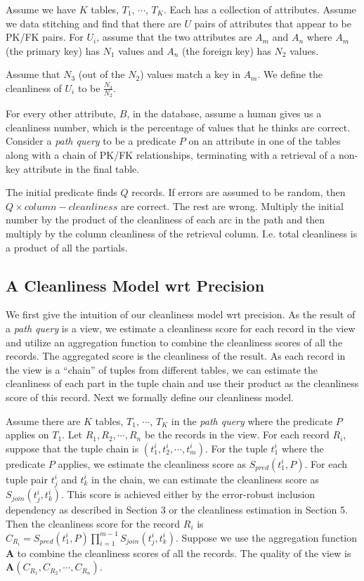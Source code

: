 Assume we have $K$ tables, $T_1$, $\cdots$, $T_K$.  Each has a collection of attributes. Assume we data stitching and find that there are $U$ pairs of attributes that appear to be PK/FK pairs.  For $U_i$, assume that the two attributes are $A_m$ and $A_n$ where $A_m$ (the primary key) has $N_1$ values and $A_n$ (the foreign key) has $N_2$ values. 

Assume that $N_3$ (out of the $N_2$) values match a key in $A_m$. We define the cleanliness of $U_i$ to be $\frac{N_3}{N_2}$.

For every other attribute, $B$, in the database, assume a human gives us a cleanliness number, which is the percentage of values that he thinks are correct. Consider a \emph{path query} to be a predicate $P$ on an attribute in one of the tables along with a chain of PK/FK relationships, terminating with a retrieval of a non-key attribute in the final table.

The initial predicate finds $Q$ records. If errors are assumed to be random, then $Q \times column-cleanliness$ are correct. The rest are wrong.  Multiply the initial number by the product of the cleanliness of each arc in the path and then multiply by the column cleanliness of the retrieval column. I.e. total cleanliness is a product of all the partials.



\subsection{A Cleanliness Model wrt Precision}\label{subsec:model:precision}


We first give the intuition of our cleanliness model wrt precision. As the result of a \emph{path query} is a view, we estimate a cleanliness score for each record in the view and utilize an aggregation function to combine the cleanliness scores of all the records. The aggregated score is the cleanliness of the result. As each record in the view is a ``chain'' of tuples from different tables, we can estimate the cleanliness of each part in the tuple chain and use their product as the cleanliness score of this record. Next we formally define our cleanliness model.


Assume there are $K$ tables, $T_1$, $\cdots$, $T_K$ in the \emph{path query} where the predicate $P$ applies on $T_1$. Let $R_1, R_2, \cdots, R_n$ be the records in the view. For each record $R_i$, suppose that the tuple chain is $(t^i_1, t^i_2, \cdots, t^i_m)$. For the tuple $t^i_1$ where the predicate $P$ applies, we estimate the cleanliness score as $S_{pred}(t^i_1, P)$. For each tuple pair $t^i_j$ and $t^i_k$ in the chain, we can estimate the cleanliness score as $S_{join}(t^i_j,t^i_k)$. This score is achieved either by the error-robust inclusion dependency as described in Section 3 or the cleanliness estimation in Section 5. Then the cleanliness score for the record $R_i$ is $C_{R_i}=S_{pred}(t^i_1,P)\prod_{i=1}^{m-1}S_{join}(t^i_j,t^i_k)$. Suppose we use the aggregation function $\mathbf{A}$ to combine the cleanliness scores of all the records. The quality of the view is $\mathbf{A}(C_{R_1}, C_{R_2}, \cdots, C_{R_n})$.



